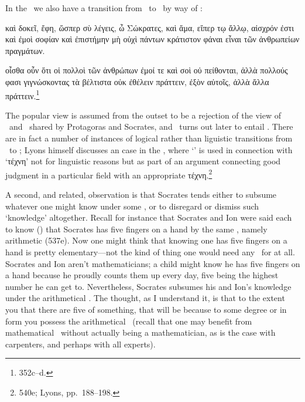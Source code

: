 \documentclass[11pt,letterpaper,oneside]{amsart} %
\begin{document}
In the \prot\ we also have a transition from \gignoskein\ to \techne\ by way of \episteme:\begin{squote}καὶ δοκεῖ, ἔφη, ὥσπερ σὺ λέγεις, ὦ Σώκρατες, καὶ ἅμα, εἴπερ τῳ ἄλλῳ, αἰσχρόν ἐστι καὶ ἐμοὶ σοφίαν καὶ ἐπιστήμην μὴ οὐχὶ πάντων κράτιστον φάναι εἶναι τῶν ἀνθρωπείων πραγμάτων.

οἶσθα οὖν ὅτι οἱ πολλοὶ τῶν ἀνθρώπων ἐμοί τε καὶ σοὶ οὐ πείθονται, ἀλλὰ πολλούς φασι γιγνώσκοντας τὰ βέλτιστα οὐκ ἐθέλειν πράττειν, ἐξὸν αὐτοῖς, ἀλλὰ ἄλλα πράττειν.\footnote{352c--d.}\end{squote}The popular view is assumed from the outset to be a rejection of the view of \sophia\ and \episteme\ shared by Protagoras and Socrates, and \episteme\ turns out later to entail \techne. There are in fact a number of instances of logical rather than liguistic transitions from \gignoskein\ to \techne; Lyons himself discusses an case in the , where `\gignoskein' is used in connection with `τέχνη' not for linguistic reasons but as part of an argument connecting good judgment in a particular field with an appropriate τέχνη.\footnote{540e; Lyons, pp.\ 188--198.} 



A second, and related, observation is that Socrates tends either to subsume whatever one might know under some \techne, or to disregard or dismiss such `knowledge' altogether. Recall for instance that Socrates and Ion were said each to know (\gignoskein) that Socrates has five fingers on a hand by the same \techne, namely arithmetic (537e). Now one might think that knowing one has five fingers on a hand is pretty elementary---not the kind of thing one would need any \techne\ for at all. Socrates and Ion aren't mathematicians; a child might know he has five fingers on a hand because he proudly counts them up every day, five being the highest number he can get to. Nevertheless, Socrates subsumes his and Ion's knowledge under the arithmetical \techne. The thought, as I understand it, is that to the extent you  that there are five of something, that will be because to some degree or in form you possess the arithmetical \techne\ (recall that one may benefit from mathematical \technai\ without actually being a mathematician, as is the case with carpenters, and perhaps with all experts). 
\end{document}
